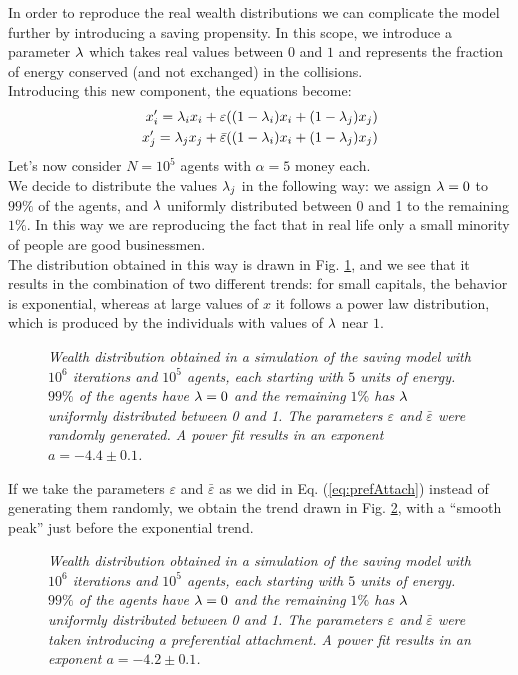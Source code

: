 In order to reproduce the real wealth distributions we can complicate the model further by introducing a saving propensity.
In this scope, we introduce a parameter $\lambda$ which takes real values between $0$ and $1$ and represents the fraction of energy conserved (and not exchanged) in the collisions. \\
Introducing this new component, the equations become:
\begin{equation*}
	\begin{split}
		x'_i = \lambda_ix_i + \varepsilon((1-\lambda_i)x_i + (1-\lambda_j)x_j) 	\\
		x'_j = \lambda_jx_j + \bar{\varepsilon}((1-\lambda_i)x_i + (1-\lambda_j)x_j) 	\\
	\end{split}
\end{equation*}
Let's now consider $N = 10^5$ agents with $\alpha = 5$ money each. \\
We decide to distribute the values $\lambda_j$ in the following way: we assign $\lambda = 0$ to $99 \%$ of the agents, and $\lambda$ uniformly distributed between 0 and 1 to the remaining $1 \%$.
In this way we are reproducing the fact that in real life only a small minority of people are good businessmen. \\
The distribution obtained in this way is drawn in Fig. \ref{fig:savings}, and we see that it results in the combination of two different trends: for small capitals, the behavior is exponential, whereas at large values of $x$ it follows a power law distribution, which is produced by the individuals with values of $\lambda$ near $1$.
\begin{figure}[H]
    \centering
    \scalebox{.7}{}
    \caption{\emph{Wealth distribution obtained in a simulation of the saving model with $10^6$ iterations and $10^5$ agents, each starting with $5$ units of energy.
					$99\%$ of the agents have $\lambda = 0$ and the remaining $1\%$ has $\lambda$ uniformly distributed between 0 and 1.
					The parameters $\varepsilon$ and $\bar{\varepsilon}$ were randomly generated.
					A power fit results in an exponent $a = -4.4 \pm 0.1$.}}
    \label{fig:savings}
\end{figure}
If we take the parameters $\varepsilon$ and $\bar{\varepsilon}$ as we did in Eq. (\ref{eq:prefAttach}) instead of generating them randomly, we obtain the trend drawn in Fig. \ref{fig:savingsPref}, with a ``smooth peak'' just before the exponential trend.
\begin{figure}[H]
    \centering
    \scalebox{.7}{}
    \caption{\emph{Wealth distribution obtained in a simulation of the saving model with $10^6$ iterations and $10^5$ agents, each starting with $5$ units of energy.
					$99\%$ of the agents have $\lambda = 0$ and the remaining $1\%$ has $\lambda$ uniformly distributed between 0 and 1.
					The parameters $\varepsilon$ and $\bar{\varepsilon}$ were taken introducing a preferential attachment.
					A power fit results in an exponent $a = -4.2 \pm 0.1$.}}
    \label{fig:savingsPref}
\end{figure}
